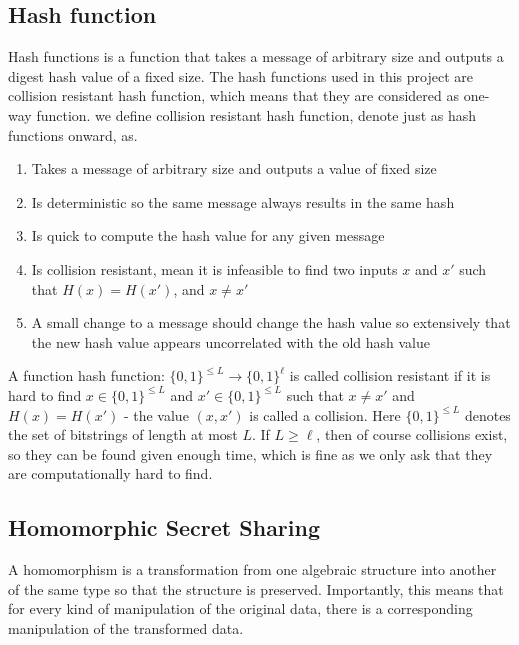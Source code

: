 \subsection{Hash function}
Hash functions is a function that takes a message of arbitrary size and outputs a digest hash value of a fixed size. The hash functions used in this project are collision resistant hash function, which means that they are considered as one-way function. we define collision resistant hash function, denote just as hash functions onward, as.

\begin{defi}
\begin{enumerate}
    \item Takes a message of arbitrary size and outputs a value of fixed size
    \item Is deterministic so the same message always results in the same hash
    \item Is quick to compute the hash value for any given message
    \item Is collision resistant, mean it is infeasible to find two inputs $x$ and $x'$ such that $H(x) = H(x')$, and $x \neq x'$
    \item A small change to a message should change the hash value so extensively that the new hash value appears uncorrelated with the old hash value
\end{enumerate}
\end{defi}

A function hash function: $\{0,1\}^{\leq L} \rightarrow \{0,1\}^\ell$ is called collision resistant if it is hard to find $x \in \{0,1\}^{\leq L}$ and $x' \in \{0,1\}^{\leq L}$ such that $x \neq x'$ and $H(x)=H(x')$ - the value $(x,x')$ is called a collision. Here $\{0,1\}^{\leq L}$ denotes the set of bitstrings of length at most $L$. If $L \geq \ell$, then of course collisions exist, so they can be found given enough time, which is fine as we only ask that they are computationally hard to find.  

\subsection{Homomorphic Secret Sharing}
A homomorphism is a transformation from one algebraic structure into another of the same type so that the structure is preserved. Importantly, this means that for every kind of manipulation of the original data, there is a corresponding manipulation of the transformed data.\\

